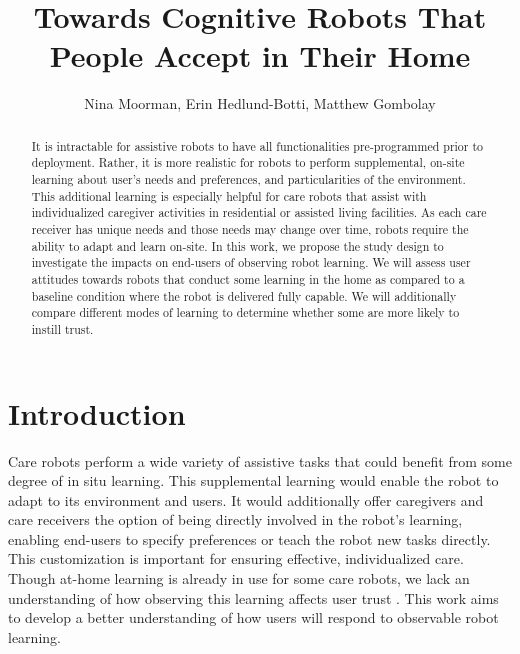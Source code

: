 \documentclass[letterpaper]{article} %
\title{Towards Cognitive Robots That People Accept in Their Home}
\author {
    Nina Moorman, %
    Erin Hedlund-Botti, %
    Matthew Gombolay %
}
\begin{document}
\maketitle

\begin{abstract}
It is intractable for assistive robots to have all functionalities pre-programmed prior to deployment. Rather, it is more realistic for robots to perform supplemental, on-site learning about user's needs and preferences, and  particularities of the environment. This additional learning is especially helpful for care robots that assist with individualized caregiver activities in residential or assisted living facilities. As each care receiver has unique needs and those needs may change over time, robots require the ability to adapt and learn on-site. In this work, we propose the study design to investigate the impacts on end-users of observing robot learning. We will assess user attitudes towards robots that conduct some learning in the home as compared to a baseline condition where the robot is delivered fully capable. We will additionally compare different modes of learning to determine whether some are more likely to instill trust.
\end{abstract}


\section{Introduction}
\label{sec:introduction}
Care robots perform a wide variety of assistive tasks that could benefit from some degree of in situ learning. This supplemental learning would enable the robot to adapt to its environment and users. It would additionally offer caregivers and care receivers the option of being directly involved in the robot's learning, enabling end-users to specify preferences or teach the robot new tasks directly. This customization is important for ensuring effective, individualized care. Though at-home learning is already in use for some care robots, we lack an understanding of how observing this learning affects user trust \cite{irobot_irobot_nodate, moxi, paro}. This work aims to develop a better understanding of how users will respond to observable robot learning. 
\end{document}
